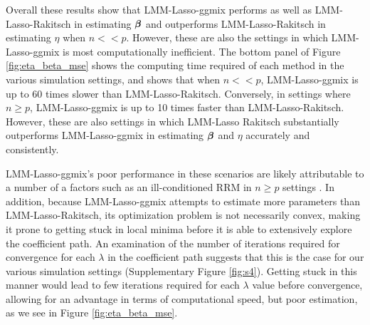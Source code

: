 Overall these results show that LMM-Lasso-ggmix performs as well as LMM-Lasso-Rakitsch in estimating $\boldsymbol{\beta}{}$ and outperforms LMM-Lasso-Rakitsch in estimating $\eta$ when $n << p$. However, these are also the settings in which LMM-Lasso-ggmix is most computationally inefficient. The bottom panel of Figure \ref{fig:eta_beta_mse} shows the computing time required of each method in the various simulation settings, and shows that when $n << p$, LMM-Lasso-ggmix is up to 60 times slower than LMM-Lasso-Rakitsch. Conversely, in settings where $n \ge p$, LMM-Lasso-ggmix is up to 10 times faster than LMM-Lasso-Rakitsch. However, these are also settings in which LMM-Lasso Rakitsch substantially outperforms LMM-Lasso-ggmix in estimating $\boldsymbol{\beta}{}$ and $\eta$ accurately and consistently. 

LMM-Lasso-ggmix's poor performance in these scenarios are likely attributable to a number of a factors such as an ill-conditioned RRM  in $n \ge p$ settings \citep{ledoit2004well}. In addition, because LMM-Lasso-ggmix attempts to estimate more parameters than LMM-Lasso-Rakitsch, its optimization problem is not necessarily convex, making it prone to getting stuck in local minima before it is able to extensively explore the coefficient path. An examination of the number of iterations required for convergence for each $\lambda$ in the coefficient path suggests that this is the case for our various simulation settings (Supplementary Figure \ref{fig:s4}). Getting stuck in this manner would lead to few iterations required for each $\lambda$ value before convergence, allowing for an advantage in terms of computational speed, but poor estimation, as we see in Figure \ref{fig:eta_beta_mse}.

